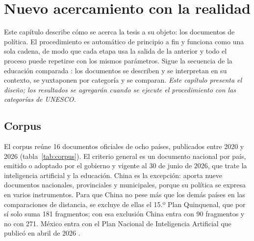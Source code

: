
\providecommand{\pendiente}[1]{\textbf{[Pendiente: #1]}}

\chapter{Nuevo acercamiento con la realidad}
\label{cap:acercamiento}

Este capítulo describe cómo se acerca la tesis a su objeto: los documentos de política. El
procedimiento es automático de principio a fin y funciona como una sola cadena, de modo que
cada etapa usa la salida de la anterior y todo el proceso puede repetirse con los mismos
parámetros. Sigue la secuencia de la educación comparada \citep{bereday1964comparative,
adick2018bereday}: los documentos se describen y se interpretan en su contexto, se
yuxtaponen por categoría y se comparan. \textit{Este capítulo presenta el diseño; los
resultados se agregarán cuando se ejecute el procedimiento con las categorías de UNESCO.}

\section{Corpus}
\label{sec:corpus}

El corpus reúne 16 documentos oficiales de ocho países, publicados entre 2020 y 2026
(tabla~\ref{tab:corpus}). El criterio general es un documento nacional por país, emitido o
adoptado por el gobierno y vigente al 30 de junio de 2026, que trate la inteligencia
artificial y la educación. China es la excepción: aporta nueve documentos nacionales,
provinciales y municipales, porque su política se expresa en varios instrumentos. Para que
China no pese más que los demás países en las comparaciones de distancia, se excluye de
ellas el 15.º Plan Quinquenal, que por sí solo suma 181 fragmentos; con esa exclusión China
entra con 90 fragmentos y no con 271. México entra con el Plan Nacional de Inteligencia
Artificial que publicó en abril de 2026 \citep{atdt2026plan}.

